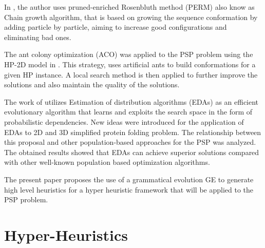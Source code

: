 \documentclass[conference]{IEEEtran}
\begin{document}


In \cite{hsu2003growth}, the author uses  pruned-enriched Rosenbluth method (PERM) also know as Chain growth algorithm, that is based on growing the sequence conformation by adding particle by particle, aiming to increase good configurations and eliminating bad ones.


The ant colony optimization (ACO) was applied to the PSP problem using the HP-2D model in \cite{shmygelska2002ant, shmygelska2003improved}. This strategy, uses artificial ants to build conformations for a given HP instance. A local search method is then applied to further improve the solutions and also maintain the quality of the solutions.

The work of \cite{santana2008protein} utilizes Estimation of distribution algorithms (EDAs) as an efficient evolutionary algorithm that learns and exploits the search space in the form of probabilistic dependencies. New ideas were introduced 
for the application of EDAs to 2D and 3D simplified protein folding problem. The relationship between this proposal and other population-based approaches for the PSP was analyzed. The obtained results showed that EDAs can achieve superior solutions compared with other well-known population based optimization algorithms.




The present paper proposes the use of a grammatical evolution GE to generate high level heuristics for a hyper heuristic framework that will be applied to the PSP problem.


\section{Hyper-Heuristics}
\end{document}
